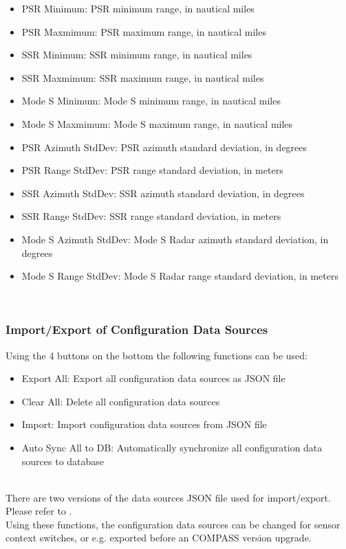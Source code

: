 \begin{itemize}
\item PSR Minimum: PSR minimum range, in nautical miles
\item PSR Maxmimum: PSR maximum range, in nautical miles
\item SSR Minimum: SSR minimum range, in nautical miles
\item SSR Maxmimum: SSR maximum range, in nautical miles
\item Mode S Minimum: Mode S minimum range, in nautical miles
\item Mode S Maxmimum: Mode S maximum range, in nautical miles
\item PSR Azimuth StdDev: PSR azimuth standard deviation, in degrees
\item PSR Range StdDev: PSR range standard deviation, in meters
\item SSR Azimuth StdDev: SSR azimuth standard deviation, in degrees
\item SSR Range StdDev: SSR range standard deviation, in meters
\item Mode S Azimuth StdDev: Mode S Radar azimuth standard deviation, in degrees
\item Mode S Range StdDev: Mode S Radar range standard deviation, in meters
\end{itemize}
\ \\

\subsubsection{Import/Export of Configuration Data Sources}
\label{sec:config_ds_export}

Using the 4 buttons on the bottom the following functions can be used:

\begin{itemize}
\item Export All: Export all configuration data sources as JSON file
\item Clear All: Delete all configuration data sources
\item Import: Import configuration data sources from JSON file
\item Auto Sync All to DB: Automatically synchronize all configuration data sources to database
\end{itemize}
\ \\

There are two versions of the data sources JSON file used for import/export. Please refer to . \\

Using these functions, the configuration data sources can be changed for sensor context switches, or e.g. exported before an COMPASS version upgrade.
